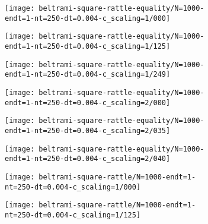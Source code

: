 \documentclass[11pt, oneside]{article}   	%
\begin{document}
\begin{figure}[H]
     \begin{subfigure}[t]{0.25\textwidth}
        \centering
        \texttt{[image: beltrami-square-rattle-equality/N=1000-endt=1-nt=250-dt=0.004-c\_scaling=1/000]}
        \caption{} \label{fig:beltrami-flow-000-e1}
    \end{subfigure}
    \begin{subfigure}[t]{0.25\textwidth}
        \centering
        \texttt{[image: beltrami-square-rattle-equality/N=1000-endt=1-nt=250-dt=0.004-c\_scaling=1/125]}
        \caption{} \label{fig:beltrami-flow-125-e1}
    \end{subfigure}
   \begin{subfigure}[t]{0.25\textwidth}
        \centering
	\texttt{[image: beltrami-square-rattle-equality/N=1000-endt=1-nt=250-dt=0.004-c\_scaling=1/249]}
        \caption{} \label{fig:beltrami-flow-249-e1}
    \end{subfigure}
   \begin{subfigure}[t]{0.25\textwidth}
        \centering
        \texttt{[image: beltrami-square-rattle-equality/N=1000-endt=1-nt=250-dt=0.004-c\_scaling=2/000]}
        \caption{} \label{fig:beltrami-flow-000-e2}
    \end{subfigure}
   \begin{subfigure}[t]{0.25\textwidth}
        \centering
        \texttt{[image: beltrami-square-rattle-equality/N=1000-endt=1-nt=250-dt=0.004-c\_scaling=2/035]}
        \caption{} \label{fig:beltrami-flow-125-e2}
    \end{subfigure}
   \begin{subfigure}[t]{0.25\textwidth}
        \centering
	\texttt{[image: beltrami-square-rattle-equality/N=1000-endt=1-nt=250-dt=0.004-c\_scaling=2/040]}
        \caption{} \label{fig:beltrami-flow-249-e2}
    \end{subfigure}
   \begin{subfigure}[t]{0.25\textwidth}
        \centering
        \texttt{[image: beltrami-square-rattle/N=1000-endt=1-nt=250-dt=0.004-c\_scaling=1/000]}
        \caption{} \label{fig:beltrami-flow-000-i}
    \end{subfigure}
   \begin{subfigure}[t]{0.25\textwidth}
        \centering
        \texttt{[image: beltrami-square-rattle/N=1000-endt=1-nt=250-dt=0.004-c\_scaling=1/125]}
        \caption{} \label{fig:beltrami-flow-125-i}
    \end{subfigure}

\end{figure}
\end{document}
